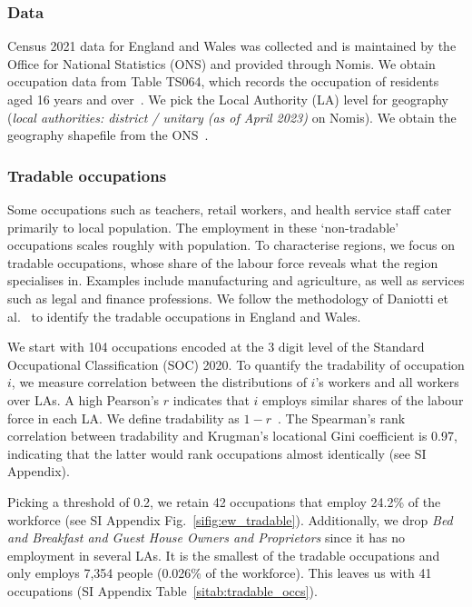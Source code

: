 \documentclass[aps,pre,floats,floatfix,superscriptaddress,twocolumn,final,10pt]{revtex4-2}
\theoremstyle{definition}
\begin{document}
\subsubsection{Data}
Census 2021 data for England and Wales was collected and is maintained by the Office for National Statistics (ONS) and provided through Nomis. We obtain occupation data from Table TS064, which records the occupation of residents aged 16 years and over~\cite{NomisTS064}. We pick the Local Authority (LA) level for geography (\textit{local authorities: district / unitary (as of April 2023)} on Nomis). We obtain the geography shapefile from the ONS~\cite{ONSShapefile}.

\subsubsection{Tradable occupations}
Some occupations such as teachers, retail workers, and health service staff cater primarily to local population. The employment in these `non-tradable' occupations scales roughly with population. To characterise regions, we focus on tradable occupations, whose share of the labour force reveals what the region specialises in. Examples include manufacturing and agriculture, as well as services such as legal and finance professions. We follow the methodology of Daniotti et al.~\cite{Daniotti2025} to identify the tradable occupations in England and Wales.

We start with 104 occupations encoded at the 3 digit level of the Standard Occupational Classification (SOC) 2020. To quantify the tradability of occupation $i$, we measure correlation between the distributions of $i$'s workers and all workers over LAs. A high Pearson's $r$ indicates that $i$ employs similar shares of the labour force in each LA. We define tradability as $1-r$~\cite{Daniotti2025}. The Spearman's rank correlation between tradability and Krugman's locational Gini coefficient is 0.97, indicating that the latter would rank occupations almost identically (see SI Appendix).

Picking a threshold of 0.2, we retain 42 occupations that employ 24.2\% of the workforce (see SI Appendix Fig.~\ref{sifig:ew_tradable}). Additionally, we drop \textit{Bed and Breakfast and Guest House Owners and Proprietors} since it has no employment in several LAs. It is the smallest of the tradable occupations and only employs 7,354 people (0.026\% of the workforce). This leaves us with 41 occupations (SI Appendix Table~\ref{sitab:tradable_occs}).
\end{document}
